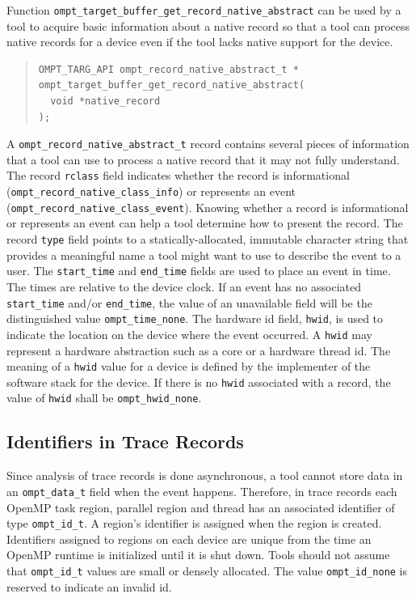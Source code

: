 \documentclass{article}
\begin{document}
Function  \verb|ompt_target_buffer_get_record_native_abstract| can be
used by a tool to acquire basic information about a native record 
so that a tool can process native records for a device even if the
tool lacks native support for the device. 
\begin{quote}
\begin{verbatim}
OMPT_TARG_API ompt_record_native_abstract_t *
ompt_target_buffer_get_record_native_abstract(
  void *native_record 
);

\end{verbatim}
\end{quote}
A  \verb|ompt_record_native_abstract_t| record contains several pieces of information that a tool can use to process a native record that it may not fully understand. The record \verb|rclass| field indicates whether the record is informational (\verb|ompt_record_native_class_info|) or represents an event (\verb|ompt_record_native_class_event|). Knowing whether a record is informational or represents an event can help a tool determine how to present the record. The record  \verb|type| field points to a statically-allocated, immutable character string that provides  a meaningful name  a tool might want to use to describe the event to a user. The \verb|start_time| and \verb|end_time| fields are used to place an event in time. The times are relative to the device clock. If an event has no associated \verb|start_time| and/or \verb|end_time|, the value of an unavailable field will be the distinguished value \verb|ompt_time_none|. The hardware id field, \verb|hwid|,  is used to indicate the location on the device where the event occurred. A \verb|hwid| may represent a hardware abstraction such as a core or a hardware thread id. The meaning of a \verb|hwid| value for a device is defined by the implementer of the software stack for the device. If there is no \verb|hwid| associated with a record, the value of \verb|hwid| shall be \verb|ompt_hwid_none|. 

\subsection{Identifiers in Trace Records}
Since analysis of trace records is done asynchronous, a tool cannot store
data in an \verb|ompt_data_t| field when the event happens. 
Therefore, in trace records each OpenMP task region, parallel region and 
thread has an associated identifier of type \verb|ompt_id_t|. 
A region’s identifier is assigned when the region is created. 
Identifiers assigned to regions on each device are unique from the time an 
OpenMP runtime is initialized until it is shut down.
Tools should not assume that \verb|ompt_id_t| values are small or densely
allocated. The value \verb|ompt_id_none| is reserved to indicate an
invalid id.
\end{document}

